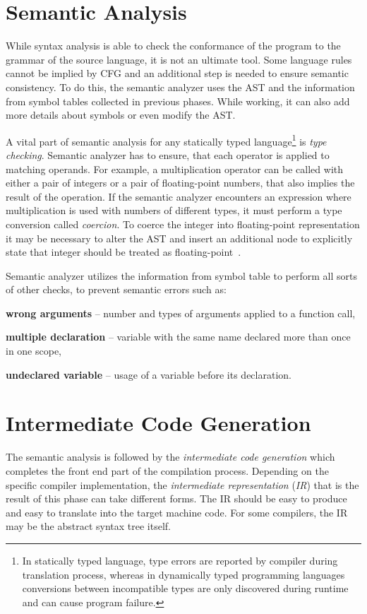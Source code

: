\documentclass[
  digital, %
  table,   %
  lof,     %
  lot,     %
  oneside,
]{fithesis3}
\begin{document}
  \section{Semantic Analysis}
While syntax analysis is able to check the conformance of the program to the grammar of the source language, it is not an ultimate tool. Some language rules cannot be implied by CFG and an additional step is needed to ensure semantic consistency. To do this, the semantic analyzer uses the AST and the information from symbol tables collected in previous phases. While working, it can also add more details about symbols or even modify the AST. 

A vital part of semantic analysis for any statically typed language\footnote{In statically typed language, type errors are reported by compiler during translation process, whereas in dynamically typed programming languages conversions between incompatible types are only discovered during runtime and can cause program failure.} is \textit{type checking}. Semantic analyzer has to ensure, that each operator is applied to matching operands. For example, a multiplication operator can be called with either a pair of integers or a pair of floating-point numbers, that also implies the result of the operation. If the semantic analyzer encounters an expression where multiplication is used with numbers of different types, it must perform a type conversion called \textit{coercion}. To coerce the integer into floating-point representation it may be necessary to alter the AST and insert an additional node to explicitly state that integer should be treated as floating-point~\cite{dragon-book}. 

Semantic analyzer utilizes the information from symbol table to perform all sorts of other checks, to prevent semantic errors such as:
\begin{compactitem}
  \item \textbf{wrong arguments} -- number and types of arguments applied to a function call,
  \item \textbf{multiple declaration} -- variable with the same name declared more than once in one scope,
  \item \textbf{undeclared variable} -- usage of a variable before its declaration.
\end{compactitem}
    
  \section{Intermediate Code Generation}
The semantic analysis is followed by the \textit{intermediate code generation} which completes the front end part of the compilation process. Depending on the specific compiler implementation, the \textit{intermediate representation} (\textit{IR}) that is the result of this phase can take different forms. The IR should be easy to produce and easy to translate into the target machine code. For some compilers, the IR may be the abstract syntax tree itself.
\end{document}
